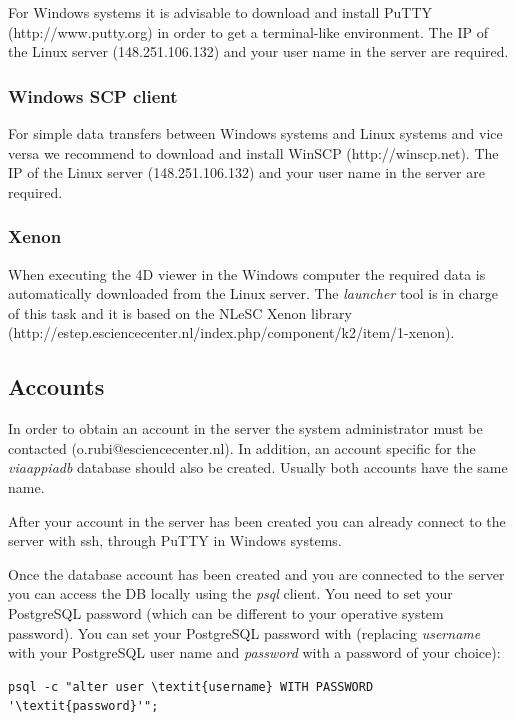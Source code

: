 \documentclass[a4paper,11pt]{article}
\begin{document}
For Windows systems it is advisable to download and install PuTTY (http://www.putty.org) in order to get a terminal-like environment. The IP of the Linux server (148.251.106.132) and your user name in the server are required.

\subsubsection{Windows SCP client}
\label{sec:winscp}

For simple data transfers between Windows systems and Linux systems and vice versa we recommend to download and install WinSCP (http://winscp.net). The IP of the Linux server (148.251.106.132) and your user name in the server are required.

\subsubsection{Xenon}

When executing the 4D viewer in the Windows computer the required data is automatically downloaded from the Linux server. The \textit{launcher} tool is in charge of this task and it is based on the NLeSC Xenon library (http://estep.esciencecenter.nl/index.php/component/k2/item/1-xenon).

\subsection{Accounts}
\label{sec:accounts}

In order to obtain an account in the server the system administrator must be contacted (o.rubi@esciencecenter.nl). In addition, an account specific for the \textit{viaappiadb} database should also be created. Usually both accounts have the same name.

After your account in the server has been created you can already connect to the server with ssh, through PuTTY in Windows systems. 

Once the database account has been created and you are connected to the server you can access the DB locally using the \textit{psql} client. You need to set your PostgreSQL password (which can be different to your operative system password). You can set your PostgreSQL password with (replacing \textit{username} with your PostgreSQL user name and \textit{password} with a password of your choice):

\begin{Verbatim}[fontfamily=courier,commandchars=\\\{\},fontsize=\footnotesize]
psql -c "alter user \textit{username} WITH PASSWORD '\textit{password}'";
\end{Verbatim}
\end{document}
